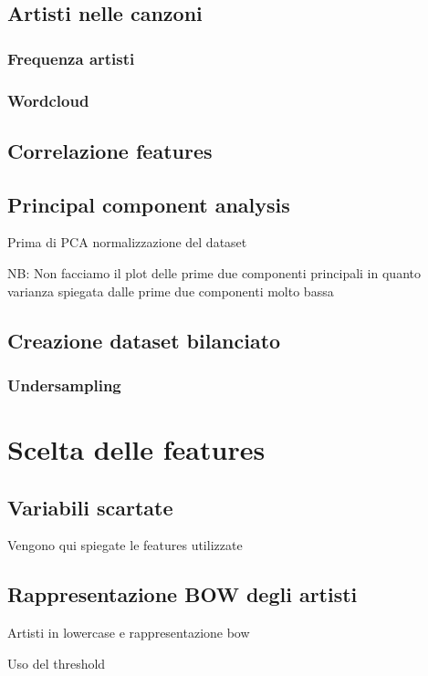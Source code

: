 \subsection{Artisti nelle canzoni}
\subsubsection{Frequenza artisti}
\subsubsection{Wordcloud}


\subsection{Correlazione features}
\label{sec:correlazione}

\subsection{Principal component analysis}
Prima di PCA normalizzazione del dataset

NB: Non facciamo il plot delle prime due componenti principali in quanto varianza spiegata dalle prime due componenti molto bassa

\subsection{Creazione dataset bilanciato}
\subsubsection{Undersampling}


\section{Scelta delle features}

\subsection{Variabili scartate}

Vengono qui spiegate le features utilizzate
\subsection{Rappresentazione BOW degli artisti}
Artisti in lowercase e rappresentazione bow

Uso del threshold

